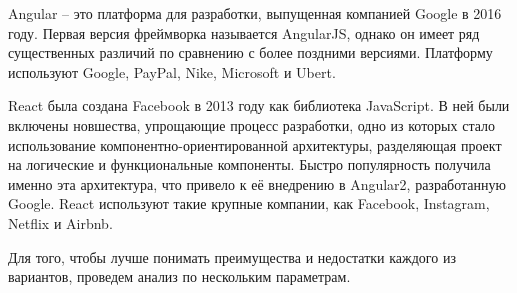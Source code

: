 Angular -- это платформа для разработки, выпущенная компанией Google в 2016 году. Первая версия фреймворка называется AngularJS, однако он имеет ряд существенных различий по сравнению с более поздними версиями. Платформу используют Google, PayPal, Nike, Microsoft и Ubert.

React была создана Facebook в 2013 году как библиотека JavaScript. В ней были включены новшества, упрощающие процесс разработки, одно из которых стало использование компонентно-ориентированной архитектуры, разделяющая проект на логические и функциональные компоненты. Быстро популярность получила именно эта архитектура, что привело к её внедрению в Angular2, разработанную Google. React используют такие крупные компании, как Facebook, Instagram, Netflix и Airbnb. 

Для того, чтобы лучше понимать преимущества и недостатки каждого из вариантов, проведем анализ по нескольким параметрам.

